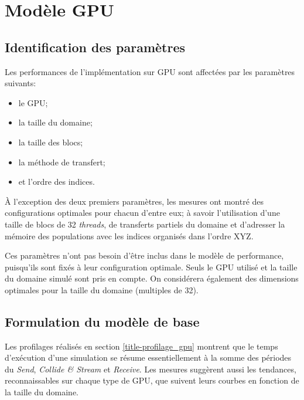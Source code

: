 \section{Modèle \acs{GPU}}
\subsection{Identification des paramètres}
\noindent Les performances de l'implémentation sur \acs{GPU} sont affectées par les paramètres suivants:
\begin{itemize}
\item le \acs{GPU};
\item la taille du domaine;
\item la taille des blocs;
\item la méthode de transfert;
\item et l'ordre des indices.
\end{itemize}
À l'exception des deux premiers paramètres, les mesures ont montré des configurations optimales pour chacun d'entre eux; à savoir l'utilisation d'une taille de blocs de 32 \textit{threads}, de transferts partiels du domaine et d'adresser la mémoire des populations avec les indices organisés dans l'ordre XYZ.

Ces paramètres n'ont pas besoin d'être inclus dans le modèle de performance, puisqu'ils sont fixés à leur configuration optimale. Seuls le \acs{GPU} utilisé et la taille du domaine simulé sont pris en compte. On considérera également des dimensions optimales pour la taille du domaine (multiples de 32).

\subsection{Formulation du modèle de base} \label{title-modele_performance}

\newcommand{\Time}[0]{T}
\newcommand{\cscoef}[0]{\Psi}
\newcommand{\scoef}[0]{\Gamma}
\newcommand{\rcoef}[0]{\digamma}

Les profilages réalisés en section \ref{title-profilage_gpu} montrent que le temps d'exécution d'une simulation se résume essentiellement à la somme des périodes du \textit{Send}, \textit{Collide \& Stream} et \textit{Receive}. Les mesures suggèrent aussi les tendances, reconnaissables sur chaque type de \acs{GPU}, que suivent leurs courbes en fonction de la taille du domaine.

